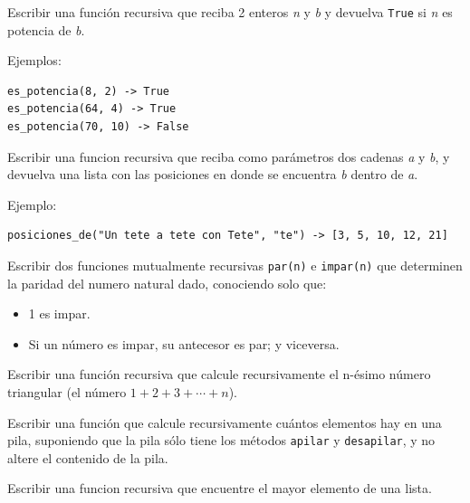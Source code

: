 \begin{ejercicio}
Escribir una función recursiva que reciba 2 enteros \emph{n} y \emph{b} y devuelva
\verb!True! si \emph{n} es potencia de \emph{b}.

Ejemplos:
\begin{verbatim}
es_potencia(8, 2) -> True
es_potencia(64, 4) -> True
es_potencia(70, 10) -> False
\end{verbatim}
\end{ejercicio}

\begin{ejercicio}
Escribir una funcion recursiva que reciba como parámetros dos cadenas \emph{a} y
\emph{b}, y devuelva una lista con las posiciones en donde se encuentra \emph{b}
dentro de \emph{a}.

Ejemplo:
\begin{verbatim}
posiciones_de("Un tete a tete con Tete", "te") -> [3, 5, 10, 12, 21]
\end{verbatim}
\end{ejercicio}

\begin{ejercicio}
Escribir dos funciones mutualmente recursivas \verb|par(n)| e \verb|impar(n)| que
determinen la paridad del numero natural dado, conociendo solo que:
\begin{itemize}
    \item 1 es impar.
    \item Si un número es impar, su antecesor es par; y viceversa.
\end{itemize}
\end{ejercicio}

\begin{ejercicio}
Escribir una función recursiva que calcule recursivamente el n-ésimo número
triangular (el número $1 + 2 + 3 + \cdots + n$).
\end{ejercicio}

\begin{ejercicio}
Escribir una función que calcule recursivamente cuántos elementos
hay en una pila, suponiendo que la pila sólo tiene los métodos \verb|apilar|
y \verb|desapilar|, y no altere el contenido de la pila.
\end{ejercicio}

\begin{ejercicio}
Escribir una funcion recursiva que encuentre el mayor elemento de una lista.
\end{ejercicio}

